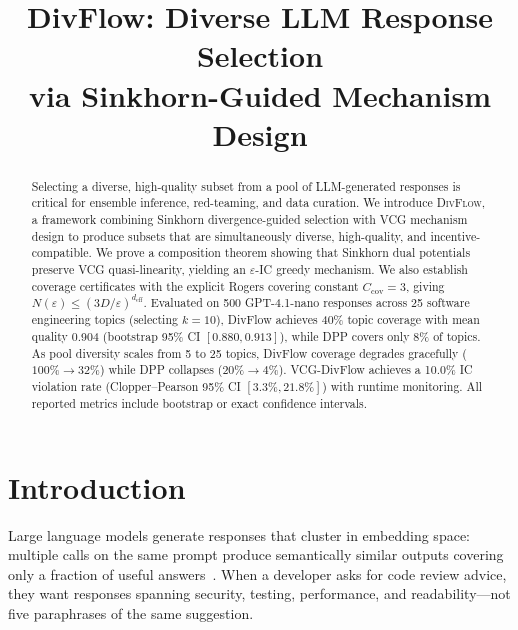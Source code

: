 \documentclass[10pt]{article}
\title{\textbf{DivFlow: Diverse LLM Response Selection\\via Sinkhorn-Guided Mechanism Design}}
\date{}
\begin{document}
\maketitle

\begin{abstract}
Selecting a diverse, high-quality subset from a pool of LLM-generated responses is critical for ensemble inference, red-teaming, and data curation.
We introduce \textsc{DivFlow}, a framework combining Sinkhorn divergence-guided selection with VCG mechanism design to produce subsets that are simultaneously diverse, high-quality, and incentive-compatible.
We prove a composition theorem showing that Sinkhorn dual potentials preserve VCG quasi-linearity, yielding an $\varepsilon$-IC greedy mechanism.
We also establish coverage certificates with the explicit Rogers covering constant $C_{\mathrm{cov}} = 3$, giving $N(\varepsilon) \leq (3D/\varepsilon)^{d_{\mathrm{eff}}}$.
Evaluated on 500 GPT-4.1-nano responses across 25 software engineering topics (selecting $k{=}10$), DivFlow achieves 40\% topic coverage with mean quality 0.904 (bootstrap 95\% CI $[0.880, 0.913]$), while DPP covers only 8\% of topics.
As pool diversity scales from 5 to 25 topics, DivFlow coverage degrades gracefully ($100\% \to 32\%$) while DPP collapses ($20\% \to 4\%$).
VCG-DivFlow achieves a 10.0\% IC violation rate (Clopper--Pearson 95\% CI $[3.3\%, 21.8\%]$) with runtime monitoring.
All reported metrics include bootstrap or exact confidence intervals.
\end{abstract}

\section{Introduction}
\label{sec:intro}

Large language models generate responses that cluster in embedding space: multiple calls on the same prompt produce semantically similar outputs covering only a fraction of useful answers~\citep{wang2023selfconsistency, li2023diverse}.
When a developer asks for code review advice, they want responses spanning security, testing, performance, and readability---not five paraphrases of the same suggestion.
\end{document}
